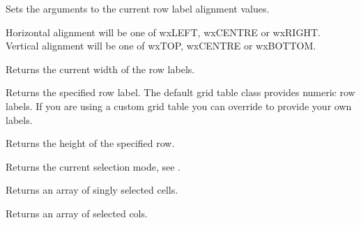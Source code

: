 Sets the arguments to the current row label alignment values.

Horizontal alignment will be one of wxLEFT, wxCENTRE or wxRIGHT. \\
Vertical alignment will be one of wxTOP, wxCENTRE or wxBOTTOM.


\label{wxgridgetrowlabelsize}


Returns the current width of the row labels.

\label{wxgridgetrowlabelvalue}


Returns the specified row label. The default grid table class provides numeric row labels.
If you are using a custom grid table you can override 
 to provide
your own labels. 

\label{wxgridgetrowsize}


Returns the height of the specified row.

\label{wxgridgetselectionmode}


Returns the current selection mode, see .

\label{wxgridgetselectedcells}


Returns an array of singly selected cells.

\label{wxgridgetselectedcols}


Returns an array of selected cols.

\label{wxgridgetselectedrows}


